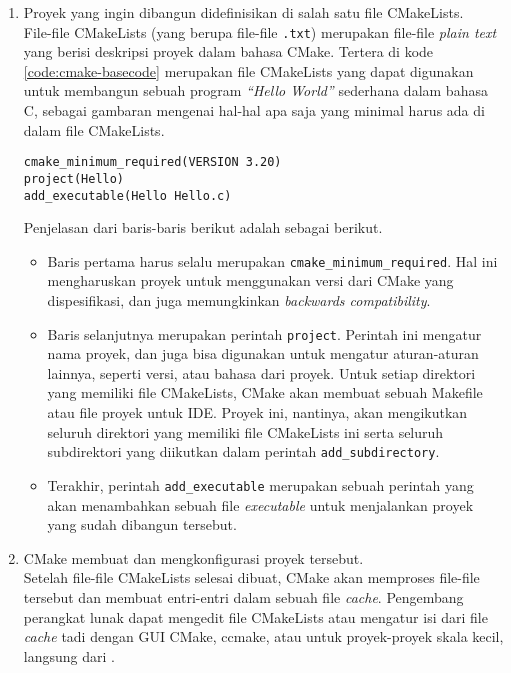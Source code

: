 \begin{enumerate}
	\item Proyek yang ingin dibangun didefinisikan di salah satu file CMakeLists.\\
	File-file CMakeLists (yang berupa file-file \verb|.txt|) merupakan file-file \textit{plain text} yang berisi deskripsi proyek dalam bahasa CMake. Tertera di kode \ref{code:cmake-basecode} merupakan file CMakeLists yang dapat digunakan untuk membangun sebuah program \textit{``Hello World''} sederhana dalam bahasa C, sebagai gambaran mengenai hal-hal apa saja yang minimal harus ada di dalam file CMakeLists.
	
	\begin{lstlisting}[caption=Kode utama operasional CMakeLists, label=code:cmake-basecode]
cmake_minimum_required(VERSION 3.20)
project(Hello)
add_executable(Hello Hello.c)
	\end{lstlisting}
	
	Penjelasan dari baris-baris berikut adalah sebagai berikut.
	
	\begin{itemize}
		\item Baris pertama harus selalu merupakan \verb|cmake_minimum_required|. Hal ini mengharuskan proyek untuk menggunakan versi dari CMake yang dispesifikasi, dan juga memungkinkan \textit{backwards compatibility}.
		\item Baris selanjutnya merupakan perintah \verb|project|. Perintah ini mengatur nama proyek, dan juga bisa digunakan untuk mengatur aturan-aturan lainnya, seperti versi, atau bahasa dari proyek.
		Untuk setiap direktori yang memiliki file CMakeLists, CMake akan membuat sebuah Makefile atau file proyek untuk IDE. Proyek ini, nantinya, akan mengikutkan seluruh direktori yang memiliki file CMakeLists ini serta seluruh subdirektori yang diikutkan dalam perintah \verb|add_subdirectory|.
		\item Terakhir, perintah \verb|add_executable| merupakan sebuah perintah yang akan menambahkan sebuah file \textit{executable} untuk menjalankan proyek yang sudah dibangun tersebut.
	\end{itemize}
	\item CMake membuat dan mengkonfigurasi proyek tersebut.\\
	Setelah file-file CMakeLists selesai dibuat, CMake akan memproses file-file tersebut dan membuat entri-entri dalam sebuah file \textit{cache}. Pengembang perangkat lunak dapat mengedit file CMakeLists atau mengatur isi dari file \textit{cache} tadi dengan GUI CMake, ccmake, atau untuk proyek-proyek skala kecil, langsung dari \cl.
	

\end{enumerate}
